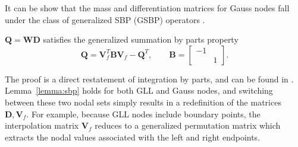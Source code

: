 \documentclass[onefignum,onetabnum,final]{siamart171218}
\newcommand{\pd}[2]{\frac{\partial#1}{\partial#2}}
\newcommand{\LRp}[1]{\left( #1 \right)}
\newcommand{\LRl}[1]{\left. #1 \right|}
\newcommand{\note}[1]{{\color{blue}{#1}}}
\begin{document}
It can be show that the mass and differentiation matrices for Gauss nodes fall under the class of generalized SBP (GSBP) operators \cite{fernandez2014generalized}.  
\begin{lemma}
\label{lemma:sbp}
$\bm{Q} = \bm{W}\bm{D}$ satisfies the generalized summation by parts property
\[
\bm{Q} = \bm{V}_f^T \bm{B} \bm{V}_f - \bm{Q}^T, \qquad \bm{B} = \begin{bmatrix}-1 & \\ & 1\end{bmatrix}.
\]
\end{lemma}
The proof is a direct restatement of integration by parts, and can be found in \cite{fernandez2014generalized, ortleb2016kinetic, ortleb2017kinetic, ranocha2018generalised}.  
Lemma~\ref{lemma:sbp} holds for both GLL and Gauss nodes, and switching between these two nodal sets simply results in a redefinition of the matrices $\bm{D}, \bm{V}_f$.  For example, because GLL nodes include boundary points, the interpolation matrix $\bm{V}_f$ reduces to a generalized permutation matrix which extracts the nodal values associated with the left and right endpoints.  %
\end{document}

